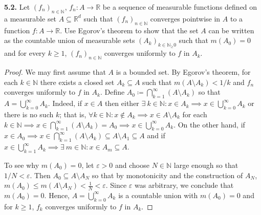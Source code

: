 \noindent \textbf{5.2.} Let \( (f_n)_{n \in \mathbb{N} }  \), \( f_n : A \to \mathbb{R} \) be a sequence of measurable functions defined on a measurable set \( A \subseteq \mathbb{R}^{d}  \) such that \( (f_n)_{n \in \mathbb{N} }  \) converges pointwise in \( A \) to a function \( f : A \to \mathbb{R} \). Use Egorov's theorem to show that the set \( A \) can be written as the countable union of measurable sets \( (A_{k} )_{k \in \mathbb{N} _ \geq 0}  \) such that \( m(A_0) = 0 \) and for every \( k \geq 1 \), \( (f_n)_{n \in \mathbb{N} }  \) converges uniformly to \( f \) in \( A_k \).
\begin{proof}
We may first assume that \( A \) is a bounded set. By Egorov's theorem, for each \( k \in \mathbb{N}  \) there exists a closed set \( A_k \subseteq A \) such that \( m(A \setminus A_k) < 1/k \) and \( f_n\) converges uniformly to \( f \) in \( A_k \). Define \( A_0 \coloneqq \bigcap_{k =1 }^{\infty} (A \setminus A_k) \) so that \( A = \bigcup_{k =0}^{\infty} A_k \). Indeed, if \( x \in A \) then either \( \exists \ k \in \mathbb{N} : x \in A_k  \implies x \in \bigcup_{k=0}^{\infty} A_k\) or there is no such \( k \); that is, \( \forall k \in \mathbb{N} : x \notin A_k \implies x \in A \setminus A_k \) for each \( k \in \mathbb{N} \implies x \in \bigcap_{k=1}^{\infty} (A \setminus A_k) = A_0 \implies x \in \bigcup_{k=0}^{\infty} A_k \). On the other hand, if \( x \in A_0 \implies x \in \bigcap_{k=1}^{\infty} (A\setminus A_k) \subseteq A \setminus A_1 \subseteq A \) and if \( x \in \bigcup_{k=1}^{\infty} A_k \implies \exists \ m \in \mathbb{N} : x \in A_m \subseteq A  \).

To see why \( m(A_0) = 0 \), let \( \varepsilon > 0 \) and choose \( N \in \mathbb{N}  \) large enough so that \( 1 / N < \varepsilon  \). Then \( A_0 \subseteq A \setminus A_N \) so that by monotonicity and the construction of \( A_N \), \( m(A_0) \leq m(A \setminus A_N) < \frac{1}{N} < \varepsilon  \). Since \( \varepsilon  \) was arbitrary, we conclude that \( m(A_0) = 0 \). Hence, \( A = \bigcup_{k=0}^{\infty} A_k \) is a countable union with \( m(A_0) = 0 \) and for \( k \geq 1 \), \( f_k \) converges uniformly to \( f \) in \( A_k \).


\end{proof}
